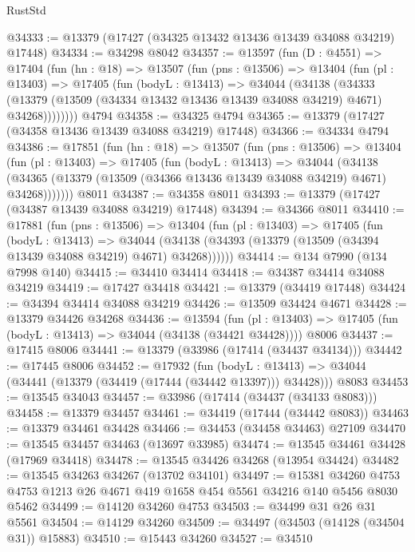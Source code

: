 \begin{lexlean}{RustStd}
\begin{coremodule}
@34333 := @13379 (@17427 (@34325 @13432 @13436 @13439 @34088 @34219) @17448)
@34334 := @34298 @8042
@34357 := @13597
    (fun (D : @4551) =>
    @17404
      (fun (hn : @18) =>
      @13507
        (fun (pns : @13506) =>
        @13404
          (fun (pl : @13403) =>
          @17405
            (fun (bodyL : @13413) =>
            @34044
              (@34138
                (@34333
                  (@13379 (@13509 (@34334 @13432 @13436 @13439 @34088 @34219) @4671) @34268))))))))
    @4794
@34358 := @34325 @4794
@34365 := @13379 (@17427 (@34358 @13436 @13439 @34088 @34219) @17448)
@34366 := @34334 @4794
@34386 := @17851
    (fun (hn : @18) =>
    @13507
      (fun (pns : @13506) =>
      @13404
        (fun (pl : @13403) =>
        @17405
          (fun (bodyL : @13413) =>
          @34044
            (@34138
              (@34365 (@13379 (@13509 (@34366 @13436 @13439 @34088 @34219) @4671) @34268)))))))
    @8011
@34387 := @34358 @8011
@34393 := @13379 (@17427 (@34387 @13439 @34088 @34219) @17448)
@34394 := @34366 @8011
@34410 := @17881
    (fun (pns : @13506) =>
    @13404
      (fun (pl : @13403) =>
      @17405
        (fun (bodyL : @13413) =>
        @34044 (@34138 (@34393 (@13379 (@13509 (@34394 @13439 @34088 @34219) @4671) @34268))))))
@34414 := @134 @7990 (@134 @7998 @140)
@34415 := @34410 @34414
@34418 := @34387 @34414 @34088 @34219
@34419 := @17427 @34418
@34421 := @13379 (@34419 @17448)
@34424 := @34394 @34414 @34088 @34219
@34426 := @13509 @34424 @4671
@34428 := @13379 @34426 @34268
@34436 := @13594
    (fun (pl : @13403) => @17405 (fun (bodyL : @13413) => @34044 (@34138 (@34421 @34428))))
    @8006
@34437 := @17415 @8006
@34441 := @13379 (@33986 (@17414 (@34437 @34134)))
@34442 := @17445 @8006
@34452 := @17932
    (fun (bodyL : @13413) => @34044 (@34441 (@13379 (@34419 (@17444 (@34442 @13397))) @34428)))
    @8083
@34453 := @13545 @34043
@34457 := @33986 (@17414 (@34437 (@34133 @8083)))
@34458 := @13379 @34457
@34461 := @34419 (@17444 (@34442 @8083))
@34463 := @13379 @34461 @34428
@34466 := @34453 (@34458 @34463) @27109
@34470 := @13545 @34457 @34463 (@13697 @33985)
@34474 := @13545 @34461 @34428 (@17969 @34418)
@34478 := @13545 @34426 @34268 (@13954 @34424)
@34482 := @13545 @34263 @34267 (@13702 @34101)
@34497 := @15381
    @34260
    @4753
    @4753
    @1213
    @26
    @4671
    @419
    @1658
    @454
    @5561
    @34216
    @140
    @5456
    @8030
    @5462
@34499 := @14120 @34260 @4753
@34503 := @34499 @31 @26 @31 @5561
@34504 := @14129 @34260
@34509 := @34497 (@34503 (@14128 (@34504 @31)) @15883)
@34510 := @15443 @34260
@34527 := @34510

\end{coremodule}
\end{lexlean}

